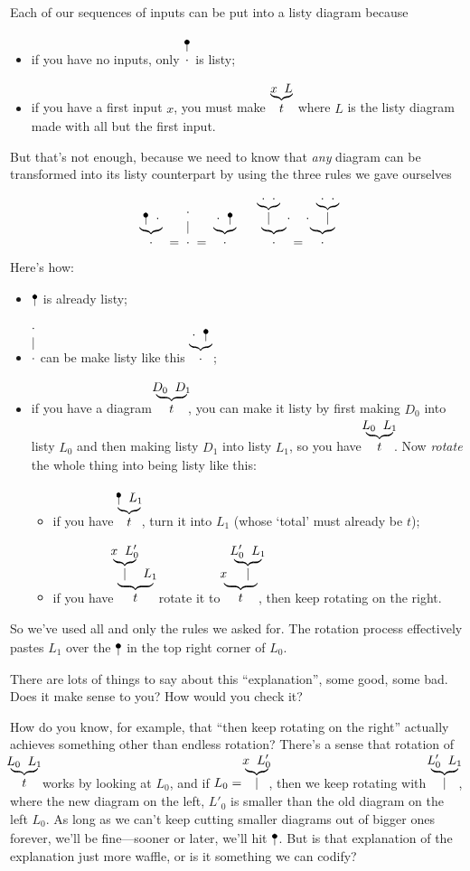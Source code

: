 \documentclass{book}
\begin{document}
Each of our sequences of inputs can be put into a listy diagram because
\begin{itemize}
\item if you have no inputs, only $\naw\cdot$ is listy;
\item if you have a first input $x$, you must make $\wye xLt$ where $L$ is the listy diagram made with all but the first input.
\end{itemize}
But that's not enough, because we need to know that \emph{any} diagram can be transformed into its listy counterpart by using the three rules we gave ourselves
\[
\wye{\naw{}}\cdot\cdot \;=\; \wid\cdot \;=\;\wye\cdot{\naw{}}\cdot \qquad
\wye{\wye\cdot\cdot\mid}\cdot\cdot \;=\; \wye\cdot{\wye\cdot\cdot\mid}\cdot
\]
Here's how:
\begin{itemize}
\item $\naw{}$ is already listy;
\item $\wid\cdot$ can be make listy like this $\wye\cdot{\naw{}}\cdot$;
\item if you have a diagram $\wye{D_0}{D_1}t$, you can make it listy by first making $D_0$ into listy $L_0$ and then making listy $D_1$ into listy $L_1$, so you have $\wye{L_0}{L_1}t$. Now \emph{rotate} the whole thing into being listy like this:
  \begin{itemize}
  \item if you have $\wye{\naw{}}{L_1}t$, turn it into $L_1$ (whose `total' must already be $t$);
  \item if you have $\wye{\wye x{L'_0}\mid}{L_1}t$ rotate it to $\wye x{\wye{L'_0}{L_1}\mid}t$, then keep rotating on the right.
  \end{itemize}
\end{itemize}
So we've used all and only the rules we asked for. The rotation process effectively pastes $L_1$ over the $\naw{}$ in the top right corner of $L_0$.

There are lots of things to say about this ``explanation'', some good, some bad. Does it make sense to you? How would you check it?

How do you know, for example, that ``then keep rotating on the right'' actually achieves something other than endless rotation? There's a sense that rotation of $\wye{L_0}{L_1}t$ works by looking at $L_0$, and if $L_0 = \wye x{L'_0}\mid$, then we keep rotating with $\wye{L'_0}{L_1}\mid$, where the new diagram on the left, $L'_0$ is smaller than the old diagram on the left $L_0$. As long as we can't keep cutting smaller diagrams out of bigger ones forever, we'll be fine---sooner or later, we'll hit $\naw{}$. But is that explanation of the explanation just more waffle, or is it something we can codify?
\end{document}
